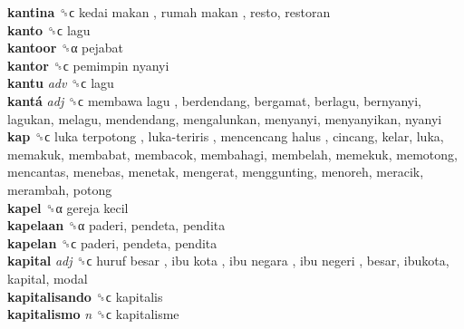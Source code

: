 \textbf{kantina} ␝ϲ   kedai makan ,  rumah makan , resto, restoran  \\
\textbf{kanto} ␝ϲ  lagu  \\
\textbf{kantoor} ␝α  pejabat  \\
\textbf{kantor} ␝ϲ   pemimpin nyanyi   \\
\textbf{kantu} \emph{adv}  ␝ϲ  lagu  \\
\textbf{kantá} \emph{adj}  ␝ϲ   membawa lagu , berdendang, bergamat, berlagu, bernyanyi, lagukan, melagu, mendendang, mengalunkan, menyanyi, menyanyikan, nyanyi  \\
\textbf{kap} ␝ϲ   luka terpotong ,  luka-teriris ,  mencencang halus , cincang, kelar, luka, memakuk, membabat, membacok, membahagi, membelah, memekuk, memotong, mencantas, menebas, menetak, mengerat, menggunting, menoreh, meracik, merambah, potong  \\
\textbf{kapel} ␝α   gereja kecil   \\
\textbf{kapelaan} ␝α  paderi, pendeta, pendita  \\
\textbf{kapelan} ␝ϲ  paderi, pendeta, pendita  \\
\textbf{kapital} \emph{adj}  ␝ϲ   huruf besar ,  ibu kota ,  ibu negara ,  ibu negeri , besar, ibukota, kapital, modal  \\
\textbf{kapitalisando} ␝ϲ  kapitalis  \\
\textbf{kapitalismo} \emph{n}  ␝ϲ  kapitalisme  \\
